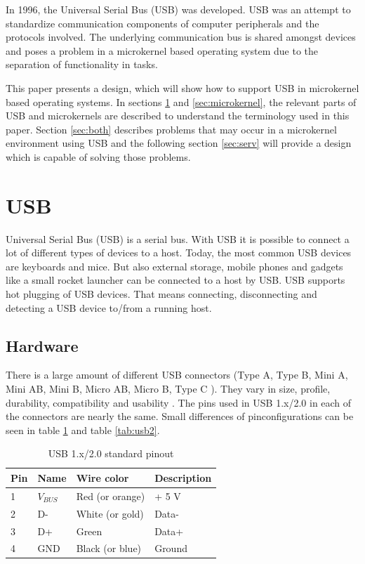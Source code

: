 \documentclass{acm_proc_article-sp}
\begin{document}
In 1996, the Universal Serial Bus (USB) was developed.
USB was an attempt to standardize communication components of computer peripherals and
the protocols involved.
The underlying communication bus is shared amongst devices and poses a problem in a microkernel based
operating system due to the separation of functionality in tasks.

This paper presents a design, which will show how to support USB in microkernel based operating systems.
In sections \ref{sec:usb} and \ref{sec:microkernel}, the relevant parts of USB and microkernels are described
to understand the terminology used in this paper.
Section \ref{sec:both} describes problems that may occur in a microkernel environment using USB and the following
section \ref{sec:serv} will provide a design which is capable of solving those problems.

\section{USB}
\label{sec:usb}
Universal Serial Bus (USB) is a serial bus.
With USB it is possible to connect a lot of different types of devices to a host.
Today, the most common USB devices are keyboards and mice.
But also external storage, mobile phones and gadgets like a small rocket launcher can be connected to a host by USB.
USB supports hot plugging of USB devices.
That means connecting, disconnecting and detecting a USB device to/from a running host.

\subsection{Hardware}
There is a large amount of different USB connectors (Type A, Type B, Mini A, Mini AB, Mini B, Micro AB, Micro B, Type C \cite{usborg}).
They vary in size, profile, durability, compatibility and usability \cite{dowell}.
The pins used in USB 1.x/2.0 in each of the connectors are nearly the same.
Small differences of pinconfigurations can be seen in table \ref{tab:usb1} and table \ref{tab:usb2}.

\begin{table}
\centering
\caption{USB 1.x/2.0 standard pinout}
\label{tab:usb1}
\begin{tabular}{|l|l|l|l|} \hline
Pin & Name & Wire color & Description\\ \hline
1 & $V_{BUS}$ & Red (or orange) & + 5 V\\ \hline
2 & D- & White (or gold) & Data-\\ \hline
3 & D+ & Green & Data+\\ \hline
4 & GND & Black (or blue) & Ground\\ \hline
\end{tabular}
\end{table}
\end{document}
